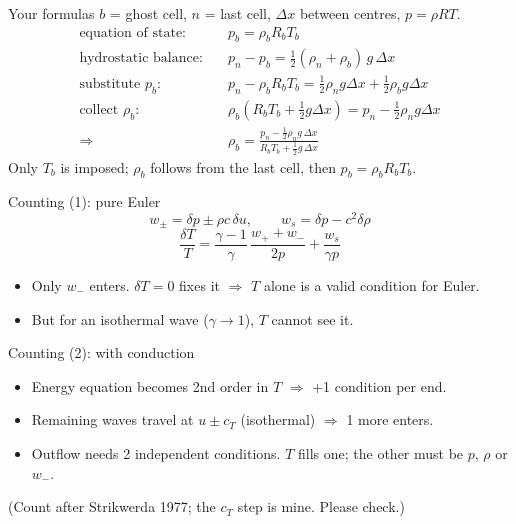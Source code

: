 \documentclass[aspectratio=169,11pt]{beamer}
\begin{document}
\begin{frame}{Your formulas}
  $b$ = ghost cell, $n$ = last cell, $\Delta x$ between centres, $p=\rho RT$.
  \vspace{-0.4em}
  \begin{align*}
    \text{equation of state:}\quad & p_b = \rho_b R_b T_b \\
    \text{hydrostatic balance:}\quad & p_n - p_b = \tfrac12(\rho_n+\rho_b)\,g\,\Delta x \\[0.3em]
    \text{substitute } p_b:\quad & p_n - \rho_b R_b T_b = \tfrac12\rho_n g\Delta x + \tfrac12\rho_b g\Delta x \\
    \text{collect } \rho_b:\quad & \rho_b\left(R_bT_b + \tfrac12 g\Delta x\right) = p_n - \tfrac12\rho_n g\Delta x \\
    \Rightarrow\quad & \boxed{\rho_b = \frac{p_n - \tfrac12\rho_n g\,\Delta x}{R_bT_b + \tfrac12 g\,\Delta x}}
  \end{align*}
  \vspace{-0.3em}
  Only $T_b$ is imposed; $\rho_b$ follows from the last cell, then $p_b = \rho_b R_b T_b$.
\end{frame}

\begin{frame}{Counting (1): pure Euler}
  \[
    w_\pm = \delta p \pm \rho c\,\delta u,\qquad w_s = \delta p - c^2\delta\rho
  \]
  \[
    \frac{\delta T}{T} = \frac{\gamma-1}{\gamma}\,\frac{w_+ + w_-}{2p} + \frac{w_s}{\gamma p}
  \]
  \begin{itemize}
    \item Only $w_-$ enters. $\delta T=0$ fixes it $\Rightarrow$
          \alert{$T$ alone is a valid condition for Euler.}
    \item But for an isothermal wave ($\gamma\to1$), $T$ cannot see it.
  \end{itemize}
\end{frame}

\begin{frame}{Counting (2): with conduction}\label{fr:count2}
  \begin{itemize}
    \item Energy equation becomes 2nd order in $T$ $\Rightarrow$ +1 condition per end.
    \item Remaining waves travel at $u\pm c_T$ (isothermal) $\Rightarrow$ 1 more enters.
    \item[$\Rightarrow$] Outflow needs \alert{2 independent conditions}.
          $T$ fills one; the other must be $p$, $\rho$ or $w_-$.
  \end{itemize}
  \vspace{0.6em}
  {\small (Count after Strikwerda 1977; the $c_T$ step is mine. Please check.)}
\end{frame}
\end{document}
